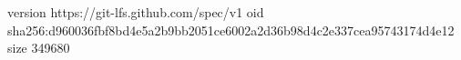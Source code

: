 version https://git-lfs.github.com/spec/v1
oid sha256:d960036fbf8bd4e5a2b9bb2051ce6002a2d36b98d4c2e337cea95743174d4e12
size 349680
